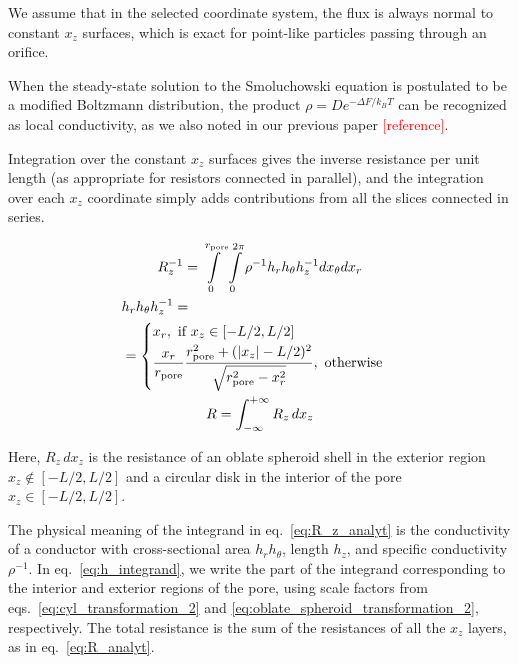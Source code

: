 \documentclass[10pt, a4paper]{article}
\newcommand\todo[1]{\textcolor{red}{#1}}
\begin{document}
\begin{multicols}{2}
We assume that in the selected coordinate system, the flux is always normal to constant $x_z$ surfaces, which is exact for point-like particles passing through an orifice.

When the steady-state solution to the Smoluchowski equation is postulated to be a modified Boltzmann distribution, the product $\rho = D e^{-\Delta F / k_B T}$ can be recognized as local conductivity, as we also noted in our previous paper \todo{[reference]}.

Integration over the constant $x_z$ surfaces gives the inverse resistance per unit length (as appropriate for resistors connected in parallel), and the integration over each $x_z$ coordinate simply adds contributions from all the slices connected in series.

\begin{gather}
    \label{eq:R_z_analyt}
    R_z^{-1} = \int\displaylimits_{0}^{r_{\textrm{pore}}} \int\displaylimits_{0}^{2\pi} \rho^{-1} h_r h_{\theta} h_z^{-1} dx_{\theta} dx_r
    \\
    \label{eq:h_integrand}
    \begin{aligned} 
        &h_r h_{\theta} h_z^{-1} = \\ &=
        \begin{cases}
            x_r, \textrm{ if } x_z \in [-L/2,L/2]
            \\[2pt]
            \dfrac{x_r}{r_{\textrm{pore}}}\dfrac{r_{\textrm{pore}}^2 + (|x_z|-L/2)^2}{\sqrt{r_{\textrm{pore}}^2 - x_r^2}}, \textrm{ otherwise}
        \end{cases}
    \end{aligned}
    \\
    \label{eq:R_analyt}
    R = \int_{-\infty}^{+\infty} R_z \, dx_z
\end{gather}

Here, $R_z \, dx_z$ is the resistance of an oblate spheroid shell in the exterior region $x_z \notin [-L/2, L/2]$ and a circular disk in the interior of the pore $x_z \in [-L/2, L/2]$.

The physical meaning of the integrand in eq.~\ref{eq:R_z_analyt} is the conductivity of a conductor with cross-sectional area $h_r h_{\theta}$, length $h_z$, and specific conductivity $\rho^{-1}$.
In eq.~\ref{eq:h_integrand}, we write the part of the integrand corresponding to the interior and exterior regions of the pore, using scale factors from eqs.~\ref{eq:cyl_transformation_2} and \ref{eq:oblate_spheroid_transformation_2}, respectively.
The total resistance is the sum of the resistances of all the $x_z$ layers, as in eq.~\ref{eq:R_analyt}.


\end{multicols}
\end{document}
